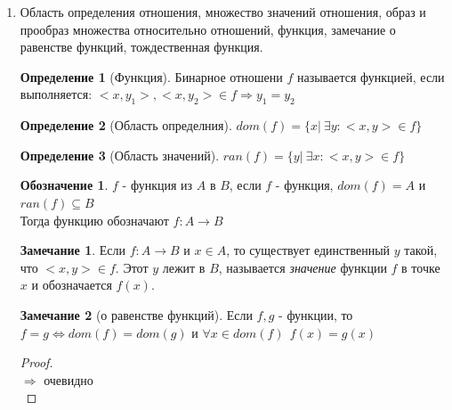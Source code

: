 \documentclass[a4paper]{article}
\theoremstyle{definition}
\newtheorem*{definition*}{Определение}
\newtheorem*{name}{Обозначение}
\newtheorem*{comment*}{Замечание}
\begin{document}
\begin{enumerate}
\begin{proof}
\begin{enumerate}
         \item Покажем, что $(R_{1}\cdot R_{2})^{-1} \subseteq R_{2}^{-1}\cdot R_{1}^{-1} $.\\
               Пусть $<z;x> \in (R_{1}\cdot R_{2})^{-1}$, тогда существует $y$ такое, что $<x;y>\in R_{1}$ и $<y;z>\in R_{2}$. Тогда $<y;x>\in R_{1}^{-1}$ и
               $<z;y>\in R_{2}^{-1}$.
               Получаем, что $<z;x> \in R_{2}^{-1}\cdot R_{1}^{-1} $.
               Обратное включение доказывается аналогично.
        \end{enumerate}
       \end{proof}
 \item Область определения отношения, множество значений отношения, образ и прообраз множества
       относительно отношений, функция, замечание о равенстве функций, тождественная функция.
       \begin{definition*}[Функция]
        Бинарное отношени $f$ называется функцией, если выполняется: $<x,y_1>, <x, y_2> \in f \Rightarrow y_1 = y_2$
       \end{definition*}
       \begin{definition*}[Область определния]
        $dom(f) = \{x|\ \exists{y} : <x,y>\in f\}$
       \end{definition*}
       \begin{definition*}[Область значений]
        $ran(f) =\{y|\ \exists{x} : <x,y>\in f\} $
       \end{definition*}
       \begin{name}
        $f$ - функция из $A$ в $B$, если
        $f$ - функция, $dom(f)=A$ и $ran(f) \subseteq{B}$\\
        Тогда функцию обозначают $f: A\rightarrow{B}$
       \end{name}
       \begin{comment*}
        Если $f:A\rightarrow{B}$ и $x\in{A}$, то существует единственный $y$ такой, что $<x,y>\in{f}$. Этот $y$ лежит в $B$, называется \textit{значение} функции $f$ в точке $x$ и обозначается $f(x)$.
       \end{comment*}
       \begin{comment*}[о равенстве функций]
        Если $f,g$ - функции, то
        \\ $f = g \Leftrightarrow dom(f)=dom(g)$ и $\forall{x}\in{dom(f)} \ \ f(x)=g(x)$
       \end{comment*}
       \begin{proof}
        \mbox{}\\
        $\Rightarrow$ очевидно\\

\end{proof}
\end{enumerate}
\end{document}
